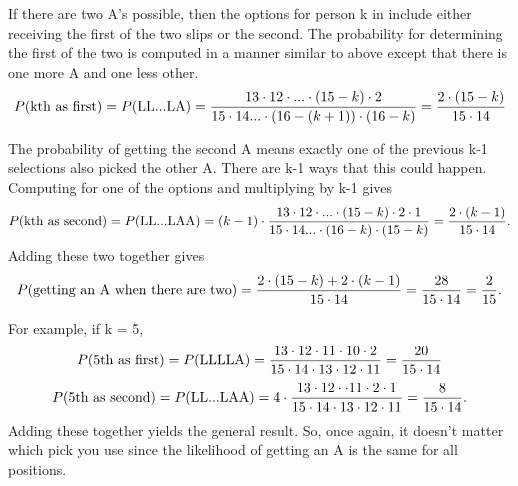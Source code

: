 \documentclass[10pt,]{book}
\theoremstyle{plain}
\theoremstyle{definition}
\theoremstyle{definition}
\theoremstyle{definition}
\numberwithin{equation}{section}
\begin{document}
	If there are two A's possible, then the options for person k in include either receiving the first of the two slips or the second. The probability for determining the first of the two is computed in a manner similar to above except that there is one more A and one less other.
	\begin{equation*} P(\text{kth as first}) = P(\text{LL...LA}) \\ = \frac{13 \cdot 12 \cdot ... \cdot (15-k)  \cdot 2}{15 \cdot 14 ... \cdot (16-(k+1)) \cdot (16-k)} = \frac{2 \cdot (15-k)}{15 \cdot 14}\end{equation*}

	The probability of getting the second A means exactly one of the previous k-1 selections also picked the other A. There are k-1 ways that this could happen. Computing for one of the options and multiplying by k-1 gives
	\begin{equation*} P(\text{kth as second}) = P(\text{LL...LAA}) \\ = (k-1) \cdot \frac{13 \cdot 12 \cdot ... \cdot (15-k) \cdot 2 \cdot 1}{15 \cdot 14 ... \cdot (16-k) \cdot (15-k)} = \frac{2 \cdot (k-1)}{15 \cdot 14}.\end{equation*}	
	Adding these two together gives
	\begin{equation*}P(\text{getting an A when there are two}) \\ = \frac{2 \cdot (15-k) + 2 \cdot (k-1)}{15 \cdot 14} = \frac{28}{15 \cdot 14} = \frac{2}{15}.\end{equation*}

	For example, if k = 5,
	\begin{equation*} P(\text{5th as first}) = P(\text{LLLLA}) \\ = \frac{13 \cdot 12 \cdot 11 \cdot 10  \cdot 2}{15 \cdot 14 \cdot 13 \cdot 12 \cdot 11} = \frac{20}{15 \cdot 14}\end{equation*}
	\begin{equation*} P(\text{5th as second}) = P(\text{LL...LAA}) \\ = 4 \cdot \frac{13 \cdot 12 \cdot \cdot 11 \cdot 2 \cdot 1}{15 \cdot 14 \cdot 13 \cdot 12 \cdot 11} \\ = \frac{8}{15 \cdot 14}.\end{equation*}	
	Adding these together yields the general result. So, once again, it doesn't matter which pick you use since the likelihood of getting an A is the same for all positions.

\par
\end{document}
